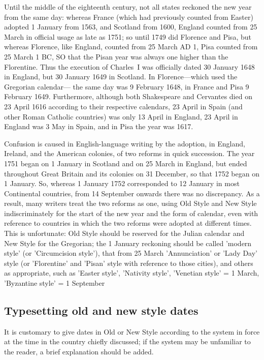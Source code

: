 Until the middle of the eighteenth century, not all states reckoned the
new year from the same day: whereas France (which had previously
counted from Easter) adopted 1 January from 1563, and Scotland from
1600, England counted from 25 March in official usage as late as 1751; so
until 1749 did Florence and Pisa, but whereas Florence, like England,
counted from 25 March AD 1, Pisa counted from 25 March 1 BC, SO that the
Pisan year was always one higher than the Florentine. Thus the execution
of Charles~I was officially dated 30 January 1648 in England, but 30
January 1649 in Scotland. In Florence---which used the Gregorian calendar---
the same day was 9 February 1648, in France and Pisa 9 February
1649. Furthermore, although both Shakespeare and Cervantes died on 23
April 1616 according to their respective calendars, 23 April in Spain (and
other Roman Catholic countries) was only 13 April in England, 23 April in
England was 3 May in Spain, and in Pisa the year was 1617.

Confusion is caused in English-language writing by the adoption, in
England, Ireland, and the American colonies, of two reforms in quick
succession. The year 1751 began on 1 January in Scotland and on 25
March in England, but ended throughout Great Britain and its colonies
on 31 December, so that 1752 began on 1 January. So, whereas 1 January
1752 corresponded to 12 January in most Continental countries, from 14
September onwards there was no discrepancy.
As a result, many writers treat the two reforms as one, using Old Style
and New Style indiscriminately for the start of the new year and the
form of calendar, even with reference to countries in which the two
reforms were adopted at different times. This is unfortunate: Old Style
should be reserved for the Julian calendar and New Style for the Gregorian;
the 1 January reckoning should be called 'modern style' (or 'Circumcision
style'), that from 25 March 'Annunciation' or 'Lady Day' style (or
'Florentine' and 'Pisan' style with reference to those cities), and others
as appropriate, such as 'Easter style', 'Nativity style', 'Venetian style' =
1 March, 'Byzantine style' = 1 September

\subsection{Typesetting old and new style dates}

It is customary to give dates in Old or New Style according to the system
in force at the time in the country chiefly discussed; if the system may be
unfamiliar to the reader, a brief explanation should be added.

